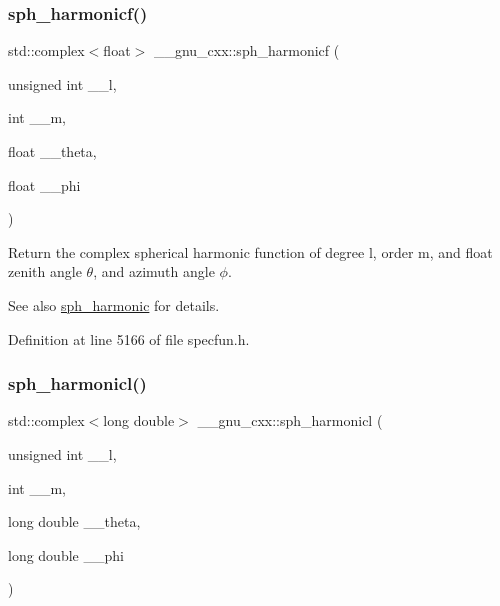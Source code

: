 \subsubsection{\texorpdfstring{sph\+\_\+harmonicf()}{sph\_harmonicf()}}
{\footnotesize\ttfamily std\+::complex$<$float$>$ \+\_\+\+\_\+gnu\+\_\+cxx\+::sph\+\_\+harmonicf (\begin{DoxyParamCaption}\item[{unsigned int}]{\+\_\+\+\_\+l,  }\item[{int}]{\+\_\+\+\_\+m,  }\item[{float}]{\+\_\+\+\_\+theta,  }\item[{float}]{\+\_\+\+\_\+phi }\end{DoxyParamCaption})\hspace{0.3cm}{\ttfamily [inline]}}

Return the complex spherical harmonic function of degree {\ttfamily l}, order {\ttfamily m}, and {\ttfamily float} zenith angle $ \theta $, and azimuth angle $ \phi $.

\begin{DoxySeeAlso}{See also}
\hyperlink{group__mathsf__gnu_gacbff28988d5d36f0c3b3fe03d4f57896}{sph\+\_\+harmonic} for details. 
\end{DoxySeeAlso}


Definition at line 5166 of file specfun.\+h.

\mbox{\label{group__mathsf__gnu_ga414c8374b4579aa14e38f5401304b6fa}} 
\subsubsection{\texorpdfstring{sph\+\_\+harmonicl()}{sph\_harmonicl()}}
{\footnotesize\ttfamily std\+::complex$<$long double$>$ \+\_\+\+\_\+gnu\+\_\+cxx\+::sph\+\_\+harmonicl (\begin{DoxyParamCaption}\item[{unsigned int}]{\+\_\+\+\_\+l,  }\item[{int}]{\+\_\+\+\_\+m,  }\item[{long double}]{\+\_\+\+\_\+theta,  }\item[{long double}]{\+\_\+\+\_\+phi }\end{DoxyParamCaption})\hspace{0.3cm}{\ttfamily [inline]}}

